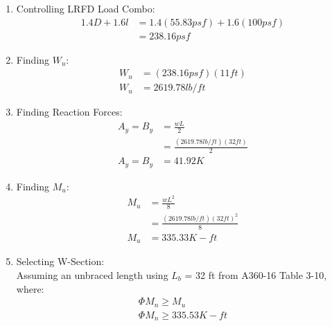 \documentclass{report} %
\begin{document}
\begin{enumerate}
    \item Controlling LRFD Load Combo:
        \begin{equation*}
            \begin{aligned}
                1.4D + 1.6l &= 1.4(55.83psf) + 1.6(100psf) \\
                            &= 238.16psf 
            \end{aligned}
        \end{equation*}
    \item Finding $W_u$:
        \begin{equation*}
            \begin{aligned}
                W_u &= (238.16psf)(11ft) \\
                W_u &= 2619.78 lb/ft 
            \end{aligned}
        \end{equation*}
    \item Finding Reaction Forces:
        \begin{equation*}
            \begin{aligned}
                A_y = B_y &= \frac{wL}{2} \\
                        &= \frac{(2619.78 lb/ft)(32 ft)}{2} \\
                A_y = B_y &= 41.92K
            \end{aligned}
        \end{equation*}
    \item Finding $M_u$:
        \begin{equation*}
            \begin{aligned}
                M_u &= \frac{wL^2}{8} \\
                    &= \frac{(2619.78 lb/ft)(32 ft)^2}{8} \\
                M_u &= 335.33 K-ft
            \end{aligned}
        \end{equation*}
    \item Selecting W-Section:\\
    Assuming an unbraced length using $L_b$ = 32 ft from A360-16 Table 3-10, where:
        \begin{equation*}
            \begin{aligned}
                \Phi M_n \geq M_u \\
                \Phi M_n \geq 335.53 K-ft
            \end{aligned}
        \end{equation*}
\end{enumerate}
\begin{center}
\end{center}
\end{document}
